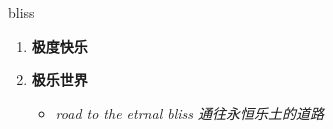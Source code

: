 
\begin{frame}
{\huge bliss}
\begin{center}
\begin{enumerate}\Large
  \item \textbf{极度快乐}
  \item \textbf{极乐世界}
  \begin{itemize}
    \item \em{\Large{road to the etrnal bliss 通往永恒乐土的道路}}
  \end{itemize}
\end{enumerate}
\end{center}
\end{frame}
